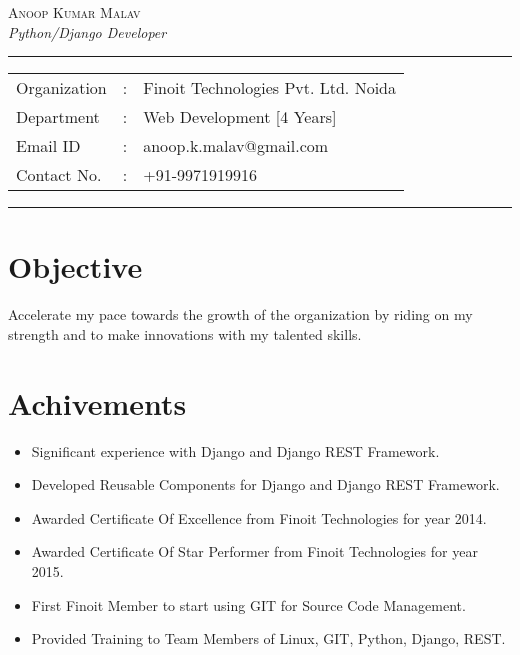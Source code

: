 \documentclass[11pt]{article}
\begin{document}
\begin{center}

\textsc{\Large Anoop Kumar Malav}
 \\[0.1cm]

\textit{\large Python/Django Developer} \\
\addvspace{0.04cm}
\rule[0.07cm]{17.52cm}{0.01cm}
\begin{tabular}{l c l}
Organization      &:& Finoit Technologies Pvt. Ltd. Noida \\
Department        &:& Web Development [4 Years]\\
Email ID          &:& anoop.k.malav@gmail.com \\
Contact No.       &:& +91-9971919916 \\
\end{tabular}

\addvspace{0.02cm}
\rule[0.02cm]{17.52cm}{0.01cm}
\end{center}

\section*{Objective}
Accelerate my pace towards the growth of the organization by riding on my strength and
to make innovations with my talented skills.

\section*{Achivements}

\begin{itemize}
 \item Significant experience with Django and Django REST Framework.
 \item Developed Reusable Components for Django and Django REST Framework.
 \item Awarded Certificate Of Excellence from Finoit Technologies for year 2014.
 \item Awarded Certificate Of Star Performer from Finoit Technologies for year 2015.
 \item First Finoit Member to start using GIT for Source Code Management.
 \item Provided Training to Team Members of Linux, GIT, Python, Django, REST.
\end{itemize}
\end{document}
